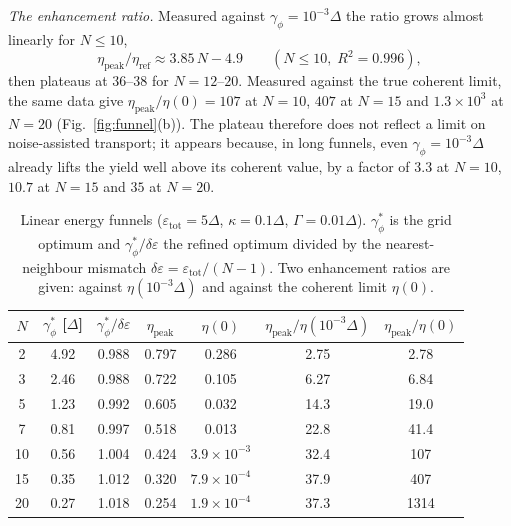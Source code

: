 \documentclass[aps,pre,preprint,floatfix]{revtex4-2}
\newcommand{\gp}{\gamma_\phi}
\newcommand{\gps}{\gamma_\phi^*}
\newcommand{\etap}{\eta_\text{peak}}
\newcommand{\etar}{\eta_\text{ref}}
\newcommand{\enh}{\etap/\etar}
\newcommand{\dE}{\delta\varepsilon}
\begin{document}
\textit{The enhancement ratio.}
Measured against $\gp=10^{-3}\Delta$ the ratio grows almost linearly for
$N\le10$,
\begin{equation}
  \enh \approx 3.85\,N - 4.9\qquad (N\le 10,\;R^2=0.996),
\end{equation}
then plateaus at $36$--$38$ for $N=12$--$20$.
Measured against the true coherent limit, the same data give
$\etap/\eta(0)=107$ at $N=10$, $407$ at $N=15$ and $1.3\times10^{3}$
at $N=20$ (Fig.~\ref{fig:funnel}(b)).
The plateau therefore does not reflect a limit on noise-assisted transport;
it appears because, in long funnels, even $\gp=10^{-3}\Delta$ already lifts the
yield well above its coherent value, by a factor of $3.3$ at $N=10$, $10.7$
at $N=15$ and $35$ at $N=20$.

\begin{table}[htbp]
\caption{\label{tab:funnel}Linear energy funnels ($\varepsilon_\text{tot}=5\Delta$,
  $\kappa=0.1\Delta$, $\Gamma=0.01\Delta$).
  $\gps$ is the grid optimum and $\gps/\dE$ the refined optimum divided by the
  nearest-neighbour mismatch $\dE=\varepsilon_\text{tot}/(N-1)$.
  Two enhancement ratios are given: against $\eta(10^{-3}\Delta)$ and against
  the coherent limit $\eta(0)$.}
\begin{ruledtabular}
\begin{tabular}{ccccccc}
$N$ & $\gps$ [$\Delta$] & $\gps/\dE$ & $\etap$ & $\eta(0)$
  & $\etap/\eta(10^{-3}\Delta)$ & $\etap/\eta(0)$ \\
\hline
 2 & 4.92 & 0.988 & 0.797 & 0.286                 & 2.75 & 2.78 \\
 3 & 2.46 & 0.988 & 0.722 & 0.105                 & 6.27 & 6.84 \\
 5 & 1.23 & 0.992 & 0.605 & 0.032                 & 14.3 & 19.0 \\
 7 & 0.81 & 0.997 & 0.518 & 0.013                 & 22.8 & 41.4 \\
10 & 0.56 & 1.004 & 0.424 & $3.9\times10^{-3}$    & 32.4 & 107  \\
15 & 0.35 & 1.012 & 0.320 & $7.9\times10^{-4}$    & 37.9 & 407  \\
20 & 0.27 & 1.018 & 0.254 & $1.9\times10^{-4}$    & 37.3 & 1314 \\
\end{tabular}
\end{ruledtabular}
\end{table}
\end{document}
